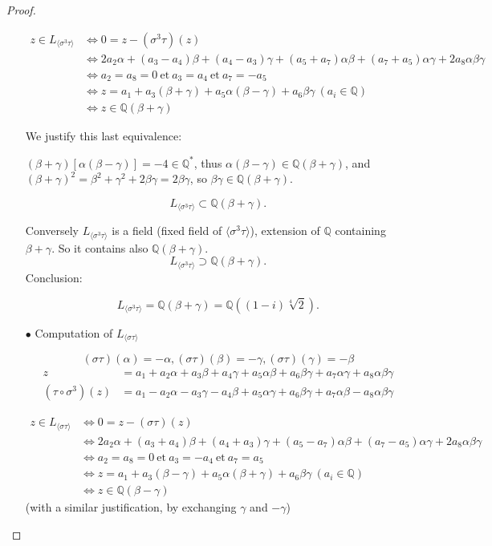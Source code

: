 \documentclass[11pt,a4paper]{article}
\newcommand{\Q}{\mathbb{Q}}
\begin{document}
\begin{proof}
\begin{enumerate}
\begin{align*}
z \in L_{\langle \sigma^3 \tau \rangle} &\iff 0 = z -(\sigma^3 \tau)(z)\\
&\iff 2a_2\alpha + (a_3-a_4) \beta+(a_4-a_3) \gamma+(a_5+a_7)\alpha\beta+(a_7+a_5)\alpha\gamma+2 a_8\alpha\beta\gamma\\
&\iff a_2=a_8= 0 \ \mathrm{et}\ a_3=a_4\ \mathrm{et}\ a_7=-a_5\\
&\iff z = a_1+ a_3 (\beta+\gamma)  + a_5 \alpha ( \beta-\gamma)+a_6\beta \gamma  \ (a_i \in \Q)\\
&\iff z \in \Q(\beta+\gamma)
\end{align*}

We justify this last equivalence:

 $(\beta+\gamma)[\alpha(\beta-\gamma)]= -4 \in \Q^*$, thus $\alpha(\beta-\gamma) \in \Q(\beta+\gamma)$, and $(\beta+\gamma)^2 = \beta^2+ \gamma^2+2\beta \gamma = 2 \beta \gamma$, so $\beta \gamma \in \Q(\beta+\gamma)$.

$$L_{\langle \sigma^3 \tau \rangle} \subset \Q(\beta+\gamma).$$

Conversely $L_{\langle \sigma^3 \tau \rangle}$ is a field (fixed field of $\langle \sigma^3 \tau \rangle$), extension of $\Q$ containing $\beta+\gamma$. So it contains also $\Q(\beta+\gamma)$.
$$L_{\langle \sigma^3 \tau \rangle} \supset \Q(\beta+\gamma).$$
Conclusion:

$$L_{\langle \sigma^3 \tau \rangle} = \Q(\beta+\gamma) = \Q((1-i)\sqrt[4]{2}).$$


\item[$\bullet$] Computation of $L_{\langle \sigma \tau \rangle}$

$$(\sigma \tau)(\alpha) = -\alpha, (\sigma \tau)(\beta) =-\gamma, (\sigma \tau)(\gamma) = -\beta$$
\begin{align*}
z &= a_1+a_2 \alpha + a_3 \beta + a_4 \gamma + a_5 \alpha \beta + a_6 \beta \gamma + a_7 \alpha \gamma + a_8 \alpha \beta \gamma\\
(\tau \circ \sigma^3)(z) &= a_1-a_2\alpha -a_3 \gamma -a_4 \beta +a_5 \alpha \gamma + a_6 \beta \gamma +a_7 \alpha \beta -a_8 \alpha \beta \gamma
\end{align*}

\begin{align*}
z \in L_{\langle \sigma \tau \rangle} &\iff 0 = z -(\sigma \tau)(z)\\
&\iff 2a_2\alpha + (a_3+a_4) \beta+(a_4+a_3) \gamma+(a_5-a_7)\alpha\beta+(a_7-a_5)\alpha\gamma+2 a_8\alpha\beta\gamma\\
&\iff a_2=a_8= 0 \ \mathrm{et}\ a_3=-a_4\ \mathrm{et}\ a_7=a_5\\
&\iff z = a_1+ a_3 (\beta-\gamma)  + a_5 \alpha ( \beta+\gamma)+a_6\beta \gamma  \ (a_i \in \Q)\\
&\iff z \in \Q(\beta-\gamma)
\end{align*}
(with a similar justification, by exchanging $\gamma$ and $-\gamma$)
 

\end{enumerate}
\end{proof}
\end{document}
